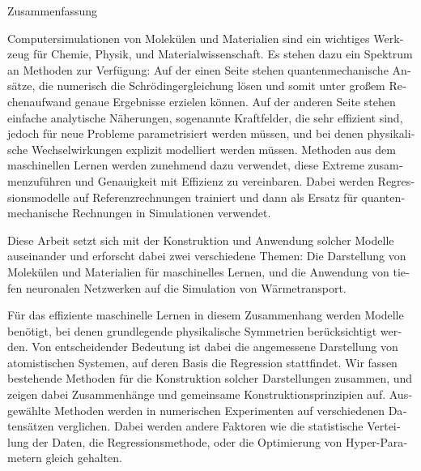 \clearpage
\thispagestyle{plain}

{\normalfont\Large\noindent Zusammenfassung}
\vspace{\baselineskip}

\begin{otherlanguage}{german}
\noindent
Computersimulationen von Molekülen und Materialien sind ein wichtiges Werkzeug für Chemie, Physik, und Materialwissenschaft. Es stehen dazu ein Spektrum an Methoden zur Verfügung: Auf der einen Seite stehen quantenmechanische Ansätze, die numerisch die Schrödingergleichung lösen und somit unter großem Rechenaufwand genaue Ergebnisse erzielen können. Auf der anderen Seite stehen einfache analytische Näherungen, sogenannte Kraftfelder, die sehr effizient sind, jedoch für neue Probleme parametrisiert werden müssen, und bei denen physikalische Wechselwirkungen explizit modelliert werden müssen. Methoden aus dem maschinellen Lernen werden zunehmend dazu verwendet, diese Extreme zusammenzuführen und Genauigkeit mit Effizienz zu vereinbaren. Dabei werden Regressionsmodelle auf Referenzrechnungen trainiert und dann als Ersatz für quantenmechanische Rechnungen in Simulationen verwendet.

Diese Arbeit setzt sich mit der Konstruktion und Anwendung solcher Modelle auseinander und erforscht dabei zwei verschiedene Themen: Die Darstellung von Molekülen und Materialien für maschinelles Lernen, und die Anwendung von tiefen neuronalen Netzwerken auf die Simulation von Wärmetransport.

Für das effiziente maschinelle Lernen in diesem Zusammenhang werden Modelle benötigt, bei denen grundlegende physikalische Symmetrien berücksichtigt werden. Von entscheidender Bedeutung ist dabei die angemessene Darstellung von atomistischen Systemen, auf deren Basis die Regression stattfindet. Wir fassen bestehende Methoden für die Konstruktion solcher Darstellungen zusammen, und zeigen dabei Zusammenhänge und gemeinsame Konstruktionsprinzipien auf. Ausgewählte Methoden werden in numerischen Experimenten auf verschiedenen Datensätzen verglichen. Dabei werden andere Faktoren wie die statistische Verteilung der Daten, die Regressionsmethode, oder die Optimierung von Hyper-Parametern gleich gehalten.


\end{otherlanguage}
